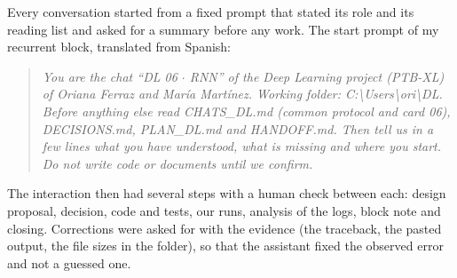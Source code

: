 Every conversation started from a fixed prompt that stated its role and its reading list and asked for a
summary before any work. The start prompt of my recurrent block, translated from Spanish:
\begin{quote}\small\itshape
You are the chat ``DL 06 $\cdot$ RNN'' of the Deep Learning project (PTB-XL) of Oriana Ferraz and Mar\'ia
Mart\'inez. Working folder: C:\textbackslash Users\textbackslash ori\textbackslash DL. Before anything else
read CHATS\_DL.md (common protocol and card 06), DECISIONS.md, PLAN\_DL.md and HANDOFF.md. Then tell us in
a few lines what you have understood, what is missing and where you start. Do not write code or documents
until we confirm.
\end{quote}
The interaction then had several steps with a human check between each: design proposal, decision, code
and tests, our runs, analysis of the logs, block note and closing. Corrections were asked for with the
evidence (the traceback, the pasted output, the file sizes in the folder), so that the assistant fixed the
observed error and not a guessed one.
